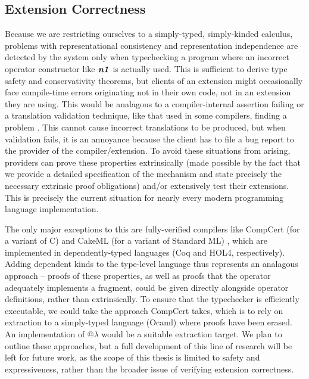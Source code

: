 \subsection{Extension Correctness}
Because we are restricting ourselves to a simply-typed, simply-kinded calculus, problems with  representational consistency and representation independence are detected by the system only when typechecking a program where an incorrect operator constructor like  $\textbf{\textit{n1}}$ is actually used. This is sufficient to derive type safety and conservativity theorems, but clients of an extension might occasionally face compile-time errors originating not in their own code, not in an extension they are using. This would be analagous to a compiler-internal assertion failing or a translation validation technique, like that used in some compilers, finding a problem \cite{Pnueli-Siegel-Singerman98}. This cannot cause incorrect translations to be produced, but when validation fails, it is an annoyance because the client has to file a bug report to the provider of the compiler/extension.  To avoid these situations from arising, providers can prove these properties extrinsically (made possible by the fact that we provide a detailed specification of the mechanism and state precisely the necessary extrinsic proof obligations) and/or extensively test their extensions. This is precisely the current situation for nearly every modern programming language implementation. 

The only major exceptions to this are fully-verified compilers like CompCert (for a variant of C) \cite{journals/cacm/Leroy09} and CakeML (for a variant of Standard ML) \cite{conf/popl/KumarMNO14}, which are implemented in dependently-typed languages (Coq and HOL4, respectively). Adding dependent kinds to the type-level language thus represents an analagous approach --  proofs of these properties, as well as proofs that the operator adequately implements a fragment, could be given directly alongside operator definitions, rather than extrinsically. To ensure that the typechecker is efficiently executable, we could take the approach CompCert takes, which is to rely on extraction  to a simply-typed language (Ocaml) where proofs have been erased. An implementation of @$\lambda$ would be a suitable extraction target. We plan to outline these  approaches, but a full development of this line of research will be left for future work, as the scope of this thesis is limited to safety and expressiveness, rather than the broader issue of verifying extension correctness.

